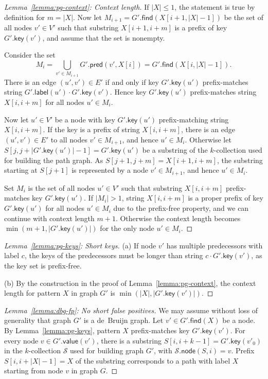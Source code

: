 \documentclass[twoside,leqno,twocolumn]{article}
\newcommand{\abs}[1]{\ensuremath{\lvert #1 \rvert}}
\newcommand{\find}{\ensuremath{\mathsf{find}}}
\newcommand{\glabel}{\ensuremath{\mathsf{label}}}
\newcommand{\gpred}{\ensuremath{\mathsf{pred}}}
\newcommand{\gkey}{\ensuremath{\mathsf{key}}}
\newcommand{\gvalue}{\ensuremath{\mathsf{value}}}
\newcommand{\gnode}{\ensuremath{\mathsf{node}}}
\newcommand{\kcollection}[1]{$#1$\nobreakdash-collection}
\begin{document}
\begin{proof}[Lemma~\ref{lemma:pg-context}: Context length]
If $\abs{X} \le 1$, the statement is true by definition for $m = \abs{X}$. Now let $M_{i+1} = G'.\find(X[i+1, \abs{X}-1])$ be the set of all nodes $v' \in V'$ such that substring $X[i+1, i+m]$ is a prefix of key $G'.\gkey(v')$, and assume that the set is nonempty.

Consider the set
$$
M_{i} = \bigcup_{v' \in M_{i+1}} G'.\gpred(v', X[i]) = G'.\find(X[i, \abs{X}-1]).
$$
There is an edge $(u', v') \in E'$ if and only if key $G'.\gkey(u')$ prefix-matches string $G'.\glabel(u') \cdot G'.\gkey(v')$. Hence key $G'.\gkey(u')$ prefix-matches string $X[i, i+m]$ for all nodes $u' \in M_{i}$.

Now let $u' \in V'$ be a node with key $G'.\gkey(u')$ prefix-matching string $X[i, i+m]$. If the key is a prefix of string $X[i, i+m]$, there is an edge $(u', v') \in E'$ to all nodes $v' \in M_{i+1}$, and hence $u' \in M_{i}$. Otherwise let $S[j, j+\abs{G'.\gkey(u')}-1] = G'.\gkey(u')$ be a substring of the \kcollection{k} used for building the path graph. As $S[j+1, j+m] = X[i+1, i+m]$, the substring starting at $S[j+1]$ is represented by a node $v' \in M_{i+1}$, and hence $u' \in M_{i}$.

Set $M_{i}$ is the set of all nodes $u' \in V'$ such that substring $X[i, i+m]$ prefix-matches key $G'.\gkey(u')$. If $\abs{M_{i}} > 1$, string $X[i, i+m]$ is a proper prefix of key $G'.\gkey(u')$ for all nodes $u' \in M_{i}$ due to the prefix-free property, and we can continue with context length $m+1$. Otherwise the context length becomes $\min(m+1, \abs{G'.\gkey(u')})$ for the only node $u' \in M_{i}$.
\end{proof}

\begin{proof}[Lemma~\ref{lemma:pg-keys}: Short keys]
(a) If node $v'$ has multiple predecessors with label $c$, the keys of the predecessors must be longer than string $c \cdot G'.\gkey(v')$, as the key set is prefix-free.

(b) By the construction in the proof of Lemma~\ref{lemma:pg-context}, the context length for pattern $X$ in graph $G'$ is $\min(\abs{X}, \abs{G'.\gkey(v')})$.
\end{proof}

\begin{proof}[Lemma~\ref{lemma:dbg-fp}: No short false positives]
We may assume without loss of generality that graph $G'$ is a de~Bruijn graph. Let $v' \in G'.\find(X)$ be a node. By Lemma~\ref{lemma:pg-keys}, pattern $X$ prefix-matches key $G'.\gkey(v')$. For every node $v \in G'.\gvalue(v')$, there is a substring $S[i, i+k-1] = G'.\gkey(v'_{0})$ in the \kcollection{k} $\mathcal{S}$ used for building graph $G'$, with $\mathcal{S}.\gnode(S, i) = v$. Prefix $S[i, i+\abs{X}-1] = X$ of the substring corresponds to a path with label $X$ starting from node $v$ in graph $G$.
\end{proof}
\end{document}
